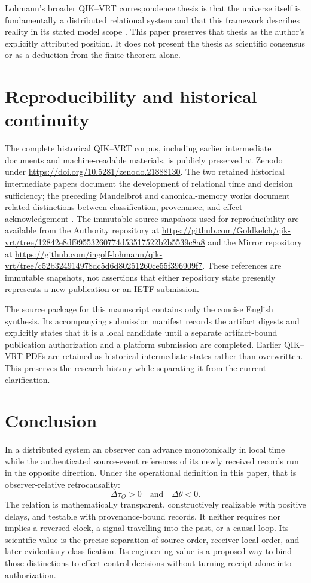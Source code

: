 \documentclass[11pt]{article}
\theoremstyle{remark}
\newcommand{\zenodo}{\url{https://doi.org/10.5281/zenodo.21888130}}
\newcommand{\authoritysnapshot}{\url{https://github.com/Goldkelch/qik-vrt/tree/12842e8df99553260774d53517522b2b5539c8a8}}
\newcommand{\mirrorsnapshot}{\url{https://github.com/ingolf-lohmann/qik-vrt/tree/c52b324914978dc5d6d80251260ce55f396909f7}}
\begin{document}
Lohmann's broader QIK--VRT correspondence thesis is that the universe itself
is fundamentally a distributed relational system and that this framework
describes reality in its stated model scope \cite{LohmannRoundTrip2026}. This
paper preserves that thesis as the author's explicitly attributed position. It
does not present the thesis as scientific consensus or as a deduction from the
finite theorem alone.

\section{Reproducibility and historical continuity}
\label{sec:reproducibility}

The complete historical QIK--VRT corpus, including earlier intermediate
documents and machine-readable materials, is publicly preserved at Zenodo
under \zenodo. The two retained historical intermediate papers document the
development of relational time and decision sufficiency; the preceding
Mandelbrot and canonical-memory works document related distinctions between
classification, provenance, and effect acknowledgement
\cite{LohmannRelationalTime2026,LohmannDecisionSufficiency2026,
LohmannMandelbrot2026,LohmannCanonicalMemory2026}. The immutable source
snapshots used for reproducibility are available from the Authority repository
at \authoritysnapshot{} and the Mirror repository at \mirrorsnapshot{}.
These references are immutable snapshots, not assertions that either
repository state presently represents a new publication or an IETF submission.

The source package for this manuscript contains only the concise English
synthesis. Its accompanying submission manifest records the artifact digests
and explicitly states that it is a local candidate until a separate
artifact-bound publication authorization and a platform submission are
completed. Earlier QIK--VRT PDFs are retained as historical intermediate
states rather than overwritten. This preserves the research history while
separating it from the current clarification.

\section{Conclusion}

In a distributed system an observer can advance monotonically in local time
while the authenticated source-event references of its newly received records
run in the opposite direction. Under the operational definition in this
paper, that is observer-relative retrocausality:
\begin{equation}
  \Delta\tau_O>0\quad\text{and}\quad\Delta\theta<0.
\end{equation}
The relation is mathematically transparent, constructively realizable with
positive delays, and testable with provenance-bound records. It neither
requires nor implies a reversed clock, a signal travelling into the past, or a
causal loop. Its scientific value is the precise separation of source order,
receiver-local order, and later evidentiary classification. Its engineering
value is a proposed way to bind those distinctions to effect-control decisions
without turning receipt alone into authorization.
\end{document}
